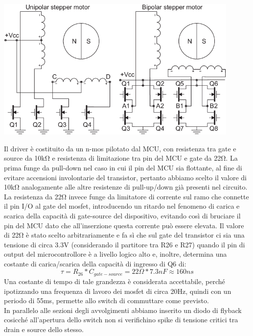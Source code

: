 \begin{center}
\includegraphics[width=0.9\textwidth]{figures/image75.png}
\captionsetup{type=figure}
\end{center}

\noindent Il driver è costituito da un n-mos pilotato dal MCU, con resistenza tra gate e source da 10kΩ 
e resistenza di limitazione tra pin del MCU e gate da 22Ω. 
La prima funge da pull-down nel caso in cui il pin
del MCU sia flottante, al fine di evitare accensioni involontarie del
transistor, pertanto abbiamo scelto il valore di 10kΩ analogamente alle
altre resistenze di pull-up/down già presenti nel circuito. La
resistenza da 22Ω invece funge da limitatore di corrente sul ramo che connette il pin I/O al
gate del mosfet, introducendo un ritardo nel fenomeno di carica e scarica
della capacità di gate-source del dispositivo, evitando così di bruciare
il pin del MCU dato che all'inserzione questa corrente può essere
elevata. Il valore di 22Ω è stato scelto arbitrariamente e fa sì che sul
gate del transistor ci sia una tensione di circa 3.3V (considerando il
partitore tra R26 e R27) quando il pin di output del microcontrollore è
a livello logico alto e, inoltre, determina una costante di
carica/scarica della capacità di ingresso di Q6 di:
\[\tau = R_{ 26} * C_{gate - source} = 22 \Omega * 7.3nF \approx 160ns\]
Una costante di tempo di tale grandezza è considerata accettabile,
perché ipotizzando una frequenza di lavoro dei mosfet di circa 20Hz,
quindi con un periodo di 55ms, permette allo switch di commuttare come
previsto.\\
In parallelo alle sezioni degli avvolgimenti abbiamo inserito un diodo di
flyback cosicché all'apertura dello switch non si verifichino spike di
tensione critici tra drain e source dello stesso.

